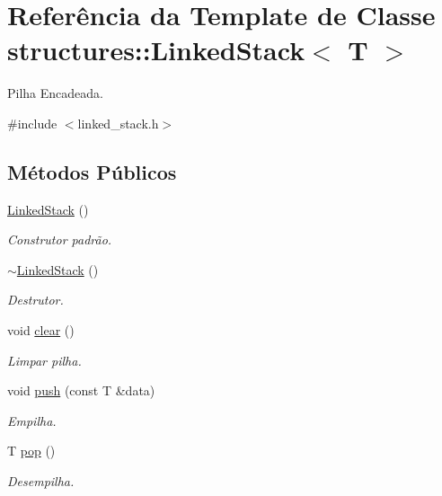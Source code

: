 \hypertarget{classstructures_1_1LinkedStack}{}\section{Referência da Template de Classe structures\+:\+:Linked\+Stack$<$ T $>$}
\label{classstructures_1_1LinkedStack}


Pilha Encadeada.  




{\ttfamily \#include $<$linked\+\_\+stack.\+h$>$}

\subsection*{Métodos Públicos}
\begin{DoxyCompactItemize}
\item 
\hyperlink{classstructures_1_1LinkedStack_a546b827cccaa49b4f470110bc3a9004e}{Linked\+Stack} ()
\begin{DoxyCompactList}\small\item\em Construtor padrão. \end{DoxyCompactList}\item 
\hyperlink{classstructures_1_1LinkedStack_aae17566eb103c92eb22be2e779286f2f}{$\sim$\+Linked\+Stack} ()
\begin{DoxyCompactList}\small\item\em Destrutor. \end{DoxyCompactList}\item 
void \hyperlink{classstructures_1_1LinkedStack_a56cc909b4a3a0ff7a589f35032ca0ba8}{clear} ()
\begin{DoxyCompactList}\small\item\em Limpar pilha. \end{DoxyCompactList}\item 
void \hyperlink{classstructures_1_1LinkedStack_adb8c6b231298ac25b17ba692d510a3fc}{push} (const T \&data)
\begin{DoxyCompactList}\small\item\em Empilha. \end{DoxyCompactList}\item 
T \hyperlink{classstructures_1_1LinkedStack_a8ff0ba0de594ec26971bb259e1d28c3c}{pop} ()
\begin{DoxyCompactList}\small\item\em Desempilha. \end{DoxyCompactList}\item 

\end{DoxyCompactItemize}
